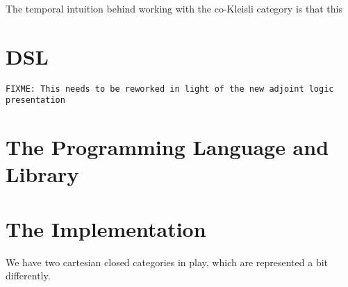 \documentclass[preprint]{sigplanconf}
\newcommand{\To}{\Rightarrow}
\newcommand{\shrink}{\rightsquigarrow}
\newcommand{\judge}[3][\Gamma]{{#1} \vdash {#2} : {#3}}
\newcommand{\judgec}[4][\Gamma]{{#1};{#2} \vdash {#3} : {#4}}
\newcommand{\const}[1]{\left<{#1}\right>}
\newcommand{\pair}[2]{({#1}, {#2})}
\newcommand{\fst}[1]{\pi_1{#1}}
\newcommand{\snd}[1]{\pi_2{#1}}
\newcommand{\unit}{()}
\newcommand{\letc}[3]{\mathsf{letc}\;{#1} = {#2}\;\mathsf{in}\;{#3}}
\newcommand{\fun}[2]{\lambda {#1}.\;{#2}}
\newcommand{\sfun}[2]{\hat{\lambda} {#1}.\;{#2}}
\newcommand{\fixme}[1]{\texttt{FIXME: {#1}}}
\begin{document}
The temporal intuition behind working with the co-Kleisli category is that this 

\section{DSL}

\fixme{This needs to be reworked in light of the new adjoint logic presentation}


\section{The Programming Language and Library}

\section{The Implementation}

We have two cartesian closed categories in play, which are
represented a bit differently. 
\end{document}
